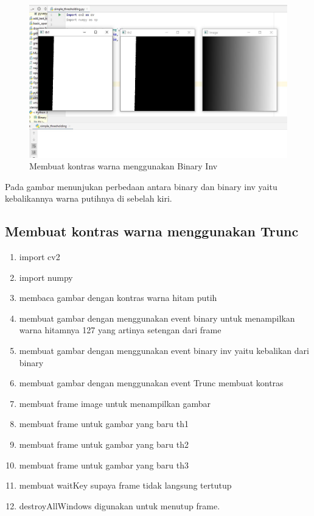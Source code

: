 \newpage
\begin{figure}[ht]
\centering
\includegraphics[scale=0.45]{figures/2,39.jpg}
\caption{Membuat kontras warna menggunakan Binary Inv}
\label{contoh}
\end{figure}
Pada gambar menunjukan perbedaan antara binary dan binary inv yaitu kebalikannya warna putihnya di sebelah kiri.




\newpage
\subsection{Membuat kontras warna menggunakan Trunc}

\begin{enumerate}
	\item import cv2
	\item import numpy
	\item membaca gambar dengan kontras warna hitam putih
	\item membuat gambar dengan menggunakan event binary untuk menampilkan warna hitamnya 127 yang artinya setengan dari frame
	\item membuat gambar dengan menggunakan event binary inv yaitu kebalikan dari binary
	\item membuat gambar dengan menggunakan event Trunc membuat kontras 
	\item membuat frame image untuk menampilkan gambar
	\item membuat frame untuk gambar yang baru th1
	\item membuat frame untuk gambar yang baru th2
	\item membuat frame untuk gambar yang baru th3
	\item membuat waitKey supaya frame tidak langsung tertutup
	\item destroyAllWindows digunakan untuk menutup frame.
\end{enumerate}


